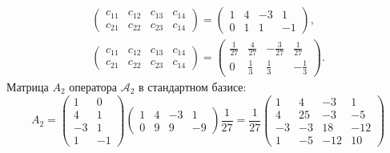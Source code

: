 \documentclass[12pt]{article}
\begin{document}
\begin{gather*}
        \begin{pmatrix}
            c_{11} & c_{12} & c_{13} & c_{14} \\
            c_{21} & c_{22} & c_{23} & c_{14}
        \end{pmatrix}
        =
        \begin{pmatrix}
            1 & 4 & -3 & 1  \\
            0 & 1 & 1  & -1
        \end{pmatrix} , \\
        \begin{pmatrix}
            c_{11} & c_{12} & c_{13} & c_{14} \\
            c_{21} & c_{22} & c_{23} & c_{14}
        \end{pmatrix}
        =
        \begin{pmatrix}
            \frac{1}{27} & \frac{4}{27} & - \frac{3}{27} & \frac{1}{27}  \\
            0            & \frac{1}{3}  & \frac{1}{3}    & - \frac{1}{3}
        \end{pmatrix} .
    \end{gather*}
    Матрица $A_2$ оператора $\mathcal{A}_2$ в стандартном базисе:
    \[
        A_2
        =
        \begin{pmatrix}
            1  & 0  \\
            4  & 1  \\
            -3 & 1  \\
            1  & -1
        \end{pmatrix}
        \begin{pmatrix}
            1 & 4 & -3 & 1  \\
            0 & 9 & 9  & -9
        \end{pmatrix}
        \frac{1}{27}
        =
        \frac{1}{27}
        \begin{pmatrix}
            1  & 4  & -3  & 1   \\
            4  & 25 & -3  & -5  \\
            -3 & -3 & 18  & -12 \\
            1  & -5 & -12 & 10
        \end{pmatrix}
    \]
\end{document}
